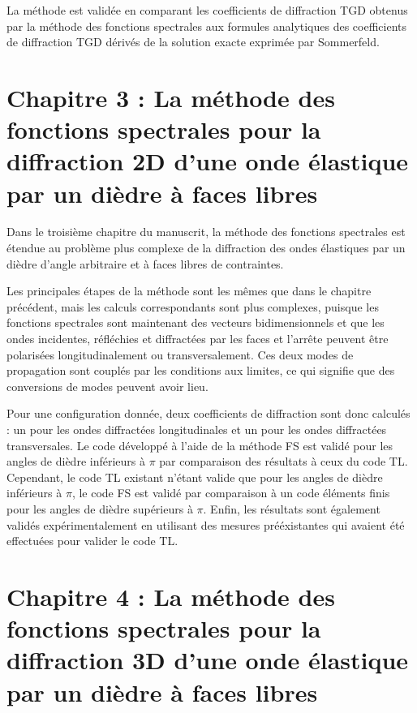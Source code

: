 La méthode est validée en comparant les coefficients de diffraction TGD obtenus par la méthode des fonctions spectrales aux formules analytiques des coefficients de diffraction TGD dérivés de la solution exacte exprimée par Sommerfeld.

\section[Résumé du chapitre 3]{Chapitre 3 : La méthode des fonctions spectrales pour la diffraction 2D d'une onde élastique par un dièdre à faces libres}

Dans le troisième chapitre du manuscrit, la méthode des fonctions spectrales est étendue au problème plus complexe de la diffraction des ondes élastiques par un dièdre d'angle arbitraire et à faces libres de contraintes.

Les principales étapes de la méthode sont les mêmes que dans le chapitre précédent, mais les calculs correspondants sont plus complexes, puisque les fonctions spectrales sont maintenant des vecteurs bidimensionnels et que les ondes incidentes, réfléchies et diffractées par les faces et l'arrête peuvent être polarisées longitudinalement ou transversalement. Ces deux modes de propagation sont couplés par les conditions aux limites, ce qui signifie que des conversions de modes peuvent avoir lieu. 

Pour une configuration donnée, deux coefficients de diffraction sont donc calculés : un pour les ondes diffractées longitudinales et un pour les ondes diffractées transversales. Le code développé à l'aide de la méthode FS est validé pour les angles de dièdre inférieurs à $\pi$ par comparaison des résultats à ceux du code TL. Cependant, le code TL existant n'étant valide que pour les angles de dièdre inférieurs à $\pi$, le code FS est validé par comparaison à un code éléments finis pour les angles de dièdre supérieurs à $\pi$. Enfin, les résultats sont également validés expérimentalement en utilisant des mesures prééxistantes qui avaient été effectuées pour valider le code TL.

\section[Résumé du chapitre 4]{Chapitre 4 : La méthode des fonctions spectrales pour la diffraction 3D d'une onde élastique par un dièdre à faces libres}

